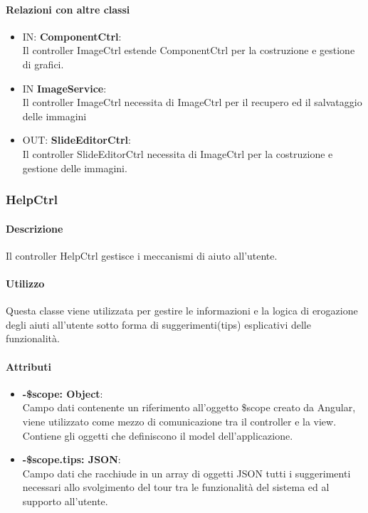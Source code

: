 	\paragraph{Relazioni con altre classi}
	\begin{itemize}
 	\item IN: \textbf{ComponentCtrl}:\\
	 	Il controller ImageCtrl estende ComponentCtrl per la costruzione e gestione di grafici.
	\item IN \textbf{ImageService}:\\
		Il controller ImageCtrl necessita di ImageCtrl per il recupero ed il salvataggio delle immagini
	\item OUT: \textbf{SlideEditorCtrl}:\\
		Il controller SlideEditorCtrl necessita di ImageCtrl per la costruzione e gestione delle immagini. 	
	\end{itemize}

\newpage

\subsubsection{HelpCtrl}
      \paragraph{Descrizione}
	Il controller HelpCtrl gestisce i meccanismi di aiuto all'utente.
	
	\paragraph{Utilizzo}
	Questa classe viene utilizzata per gestire le informazioni e la logica di erogazione degli aiuti all'utente sotto forma di suggerimenti(tips) esplicativi delle funzionalità.
	
	\paragraph{Attributi}
	\begin{itemize}
		\item \textbf{-\$scope: Object}:\\
				Campo dati contenente un riferimento all'oggetto \$scope creato da Angular, viene utilizzato come mezzo di comunicazione tra il controller e la view. Contiene gli oggetti che definiscono il model dell'applicazione.
		\item \textbf{-\$scope.tips: JSON}:\\
				Campo dati che racchiude in un array di oggetti JSON tutti i suggerimenti necessari allo svolgimento del tour tra le funzionalità del sistema ed al supporto all'utente. 
	\end{itemize}
	
